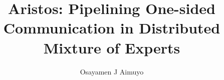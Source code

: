 \documentclass{sig-alternate-per}
\begin{document}
    \title{Aristos: Pipelining One-sided Communication in Distributed Mixture of Experts}


    \author{
        \alignauthor
        Osayamen J Aimuyo\\
        \\
    }

    \newcommand{\ata}{\emph{All-to-All}}

    \maketitle
    

    

    

    

    

    
    
\end{document}
